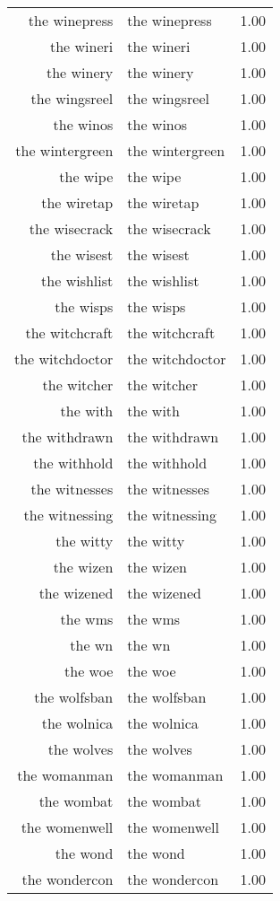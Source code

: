 \begin{table}[ht]
\begin{tabular}{rlr}
  the winepress & the winepress & 1.00 \\ 
  the wineri & the wineri & 1.00 \\ 
  the winery & the winery & 1.00 \\ 
  the wingsreel & the wingsreel & 1.00 \\ 
  the winos & the winos & 1.00 \\ 
  the wintergreen & the wintergreen & 1.00 \\ 
  the wipe & the wipe & 1.00 \\ 
  the wiretap & the wiretap & 1.00 \\ 
  the wisecrack & the wisecrack & 1.00 \\ 
  the wisest & the wisest & 1.00 \\ 
  the wishlist & the wishlist & 1.00 \\ 
  the wisps & the wisps & 1.00 \\ 
  the witchcraft & the witchcraft & 1.00 \\ 
  the witchdoctor & the witchdoctor & 1.00 \\ 
  the witcher & the witcher & 1.00 \\ 
  the with & the with & 1.00 \\ 
  the withdrawn & the withdrawn & 1.00 \\ 
  the withhold & the withhold & 1.00 \\ 
  the witnesses & the witnesses & 1.00 \\ 
  the witnessing & the witnessing & 1.00 \\ 
  the witty & the witty & 1.00 \\ 
  the wizen & the wizen & 1.00 \\ 
  the wizened & the wizened & 1.00 \\ 
  the wms & the wms & 1.00 \\ 
  the wn & the wn & 1.00 \\ 
  the woe & the woe & 1.00 \\ 
  the wolfsban & the wolfsban & 1.00 \\ 
  the wolnica & the wolnica & 1.00 \\ 
  the wolves & the wolves & 1.00 \\ 
  the womanman & the womanman & 1.00 \\ 
  the wombat & the wombat & 1.00 \\ 
  the womenwell & the womenwell & 1.00 \\ 
  the wond & the wond & 1.00 \\ 
  the wondercon & the wondercon & 1.00 \\ 

\end{tabular}
\end{table}
